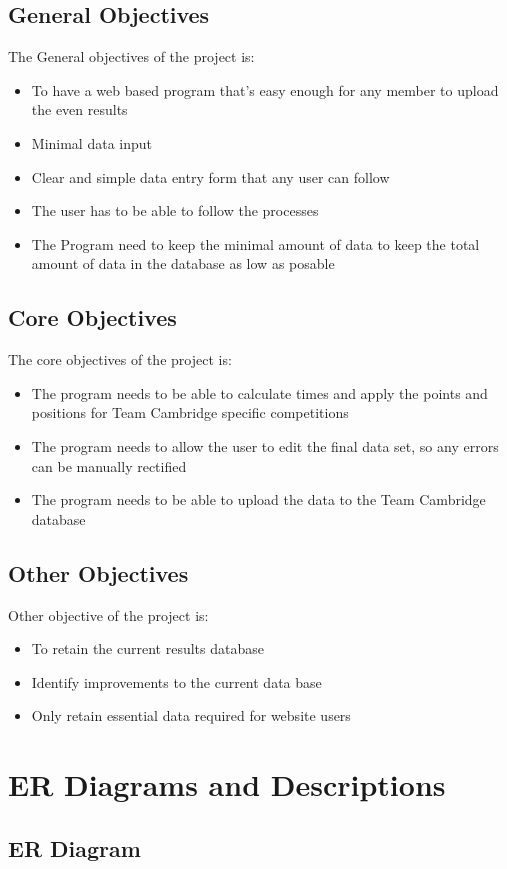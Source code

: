 \subsection{General Objectives}
The General objectives of the project is:
\begin{itemize}
	\item To have a web based program that's easy enough for any member to upload the even results
	\item Minimal data input
	\item Clear and simple data entry form that any user can follow
	\item The user has to be able to follow the processes
	\item The Program need to keep the minimal amount of data to keep the total amount of data in the database as low as posable
\end{itemize}

\subsection{Core Objectives}
The core objectives of the project is:
\begin{itemize}
	\item The program needs to be able to calculate times and apply the points and positions for Team Cambridge specific competitions
	\item The program needs to allow the user to edit the final data set, so any errors can be manually rectified
	\item The program needs to be able to upload the data to the Team Cambridge database
\end{itemize}
\subsection{Other Objectives}
Other objective of the project is:
\begin{itemize}
	\item To retain the current results database
	\item Identify improvements to the current data base
	\item Only retain essential data required for website users 
\end{itemize}
\section{ER Diagrams and Descriptions}

\subsection{ER Diagram}

